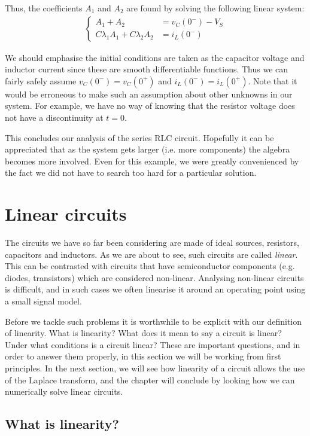 \documentclass[14pt,a5paper,twoside]{book}
\begin{document}
Thus, the coefficients $A_1$ and $A_2$ are found by solving the following linear system:
\begin{align*}
\begin{cases}
A_1 + A_2 &= v_C(0^{-}) - V_S \\
C\lambda_1 A_1 + C\lambda_2 A_2 &= i_L(0^{-})
\end{cases}
\end{align*}

We should emphasise the initial conditions are taken as the capacitor voltage and inductor current since these are smooth differentiable functions. Thus we can fairly safely assume $v_C(0^-) = v_C(0^+)$ and $i_L(0^-) = i_L(0^+)$. Note that it would be erroneous to make such an assumption about other unknowns in our system. For example, we have no way of knowing that the resistor voltage does not have a discontinuity at $t=0$.

This concludes our analysis of the series RLC circuit. Hopefully it can be appreciated that as the system gets larger (i.e. more components) the algebra becomes more involved. Even for this example, we were greatly convenienced by the fact we did not have to search too hard for a particular solution.

\section{Linear circuits}
The circuits we have so far been considering are made of ideal sources, resistors, capacitors and inductors. As we are about to see, such circuits are called \emph{linear}. This can be contrasted with circuits that have semiconductor components (e.g. diodes, transistors) which are considered non-linear. Analysing non-linear circuits is difficult, and in such cases we often linearise it around an operating point using a small signal model. 

Before we tackle such problems it is worthwhile to be explicit with our definition of linearity. What is linearity? What does it mean to say a circuit is linear? Under what conditions is a circuit linear? These are important questions, and in order to answer them properly, in this section we will be working from first principles. In the next section, we will see how linearity of a circuit allows the use of the Laplace transform, and the chapter will conclude by looking how we can numerically solve linear circuits.

\subsection{What is linearity?}
\end{document}
